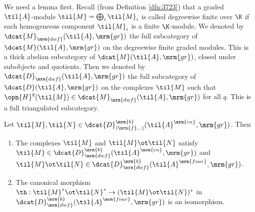 We need a lemma first. 
Recall (from Definition \ref{dfn:3723}) that a graded $\til{A}$-module 
$\til{M} = \bigoplus_i \til{M}_i$ is called degreewise finite over $\K$ if each 
homogeneous component $\til{M}_i$ is a finite $\K$-module. We denoted by 
$\dcat{M}_{\mrm{dwf}}(\til{A}, \mrm{gr})$
the full subcategory of $\dcat{M}(\til{A}, \mrm{gr})$ on the degreewise finite
graded modules. This is a thick abelian subcategory of 
$\dcat{M}(\til{A}, \mrm{gr})$, closed under subobjects and quotients.
Then we denoted by 
$\dcat{D}_{\mrm{dwf}}(\til{A}, \mrm{gr})$
the full subcategory of $\dcat{D}(\til{A}, \mrm{gr})$
on the complexes $\til{M}$ such that 
$\opn{H}^q(\til{M}) \in \dcat{M}_{\mrm{dwf}}(\til{A}, \mrm{gr})$
for all $q$. This is a full triangulated subcategory.

\begin{lem} \label{lem:4402}
Let 
$\til{M}, \til{N} \in 
\dcat{D}^{\mrm{b}}_{(\mrm{f}, ..)}(\til{A}^{\mrm{en}}, \mrm{gr})$.
Then\tup{:}
\begin{enumerate}
\item The complexes $\til{M}$ and $\til{M} \ot \til{N}$ satisfy 
$\til{M} \in \dcat{D}^{\mrm{b}}_{\mrm{dwf}}(\til{A}^{\mrm{en}}, \mrm{gr})$
and 
$\til{M} \ot \til{N} \in 
\dcat{D}^{\mrm{b}}_{\mrm{dwf}}(\til{A}^{\mrm{four}}, \mrm{gr})$. 

\item The canonical morphism 
$\th : \til{M}^* \ot \til{N}^* \to (\til{M} \ot \til{N})^*$ 
in $\dcat{D}^{\mrm{b}}_{\mrm{dwf}}(\til{A}^{\mrm{four}}, \mrm{gr})$
is an isomorphism. 
\end{enumerate}
\end{lem}


